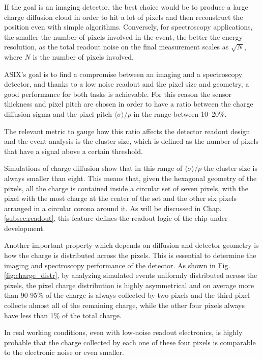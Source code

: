 If the goal is an imaging detector, the best choice would be to produce a large charge diffusion cloud in order to hit a lot of pixels and then reconstruct the position even with simple algorithms. Conversely, for spectroscopy applications, the smaller the number of pixels involved in the event, the better the energy resolution, as the total readout noise on the final measurement scales as $\sqrt{N}$, where $N$ is the number of pixels involved.

ASIX's goal is to find a compromise between an imaging and a spectroscopy detector, and thanks to a low noise readout and the pixel size and geometry, a good performance for both tasks is achievable. For this reason the sensor thickness and pixel pitch are chosen in order to have a ratio between the charge diffusion sigma and the pixel pitch $\langle \sigma \rangle / p$ in the range between 10--20\%.

The relevant metric to gauge how this ratio affects the detector readout design and the event analysis is the cluster size, which is defined as the number of pixels that have a signal above a certain threshold.

Simulations of charge diffusion show that in this range of $\langle \sigma \rangle / p$ the cluster size is always smaller than eight. This means that, given the hexagonal geometry of the pixels, all the charge is contained inside a circular set of seven pixels, with the pixel with the most charge at the center of the set and the other six pixels arranged in a circular corona around it. As will be discussed in Chap. \ref{subsec:readout}, this feature defines the readout logic of the chip under development.

Another important property which depends on diffusion and detector geometry is how the charge is distributed across the pixels. This is essential to determine the imaging and spectroscopy performance of the detector. As shown in Fig. \ref{fig:charge_distr}, by analyzing simulated events uniformly distributed across the pixels, the pixel charge distribution is highly asymmetrical and on average more than 90-95\% of the charge is always collected by two pixels and the third pixel collects almost all of the remaining charge, while the other four pixels always have less than 1\% of the total charge.

In real working conditions, even with low-noise readout electronics, is highly probable that the charge collected by each one of these four pixels is comparable to the electronic noise or even smaller. 

